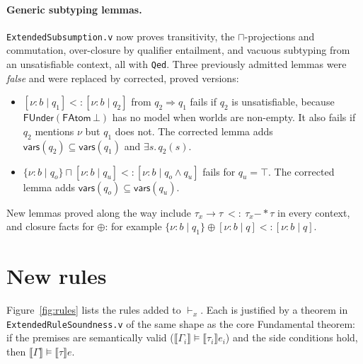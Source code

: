 \documentclass[10pt]{article}
\newcommand{\ov}[2]{\{\nu{:}#1 \mid #2\}}          %
\newcommand{\un}[2]{[\nu{:}#1 \mid #2]}            %
\newcommand{\wand}{\mathrel{-\!\!*}}
\newcommand{\inter}{\sqcap}
\newcommand{\Sum}{\oplus}
\newcommand{\vd}{\vdash_{\!x}}
\newcommand{\den}[1]{\llbracket #1 \rrbracket}
\newcommand{\sub}{\mathrel{<:}}
\newcommand{\rocq}[1]{\texttt{#1}}
\begin{document}
\paragraph{Generic subtyping lemmas.} \rocq{ExtendedSubsumption.v} now proves
transitivity, the $\inter$-projections and commutation, over-closure by
qualifier entailment, and vacuous subtyping from an unsatisfiable context, all
with \rocq{Qed}. Three previously admitted lemmas were \emph{false} and were
replaced by corrected, proved versions:
\begin{itemize}
\item $\un{b}{q_1}\sub\un{b}{q_2}$ from $q_2\Rightarrow q_1$ fails if $q_2$
  is unsatisfiable, because $\mathsf{FUnder}(\mathsf{FAtom}\,\bot)$ has no
  model when worlds are non-empty. It also fails if $q_2$ mentions $\nu$
  but $q_1$ does not. The corrected lemma adds $\mathsf{vars}(q_2)\subseteq\mathsf{vars}(q_1)$
  and $\exists s.\,q_2(s)$.
\item $\ov{b}{q_o}\inter\un{b}{q_u}\sub\un{b}{q_o\wedge q_u}$ fails for
  $q_u=\top$. The corrected lemma adds $\mathsf{vars}(q_o)\subseteq\mathsf{vars}(q_u)$.
\end{itemize}
New lemmas proved along the way include $\tau_x\to\tau\ \sub\ \tau_x\wand\tau$ in
every context, and closure facts for $\Sum$: for example
$\ov{b}{q_1}\Sum\un{b}{q}\sub\un{b}{q}$.

\section{New rules}

Figure~\ref{fig:rules} lists the rules added to $\vd$. Each is justified by a
theorem in \rocq{ExtendedRuleSoundness.v} of the same shape as the core
Fundamental theorem: if the premises are semantically valid
($\den{\Gamma_i}\models\den{\tau_i}e_i$) and the side conditions hold, then
$\den{\Gamma}\models\den{\tau}e$.
\end{document}
